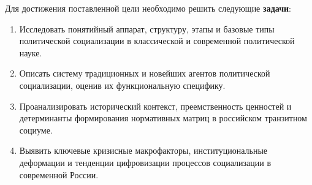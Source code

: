 Для достижения поставленной цели необходимо решить следующие \textbf{задачи}:
\begin{enumerate}
    \item Исследовать понятийный аппарат, структуру, этапы и базовые типы политической социализации в классической и современной политической науке.
    \item Описать систему традиционных и новейших агентов политической социализации, оценив их функциональную специфику.
    \item Проанализировать исторический контекст, преемственность ценностей и детерминанты формирования нормативных матриц в российском транзитном социуме.
    \item Выявить ключевые кризисные макрофакторы, институциональные деформации и тенденции цифровизации процессов социализации в современной России.
\end{enumerate}